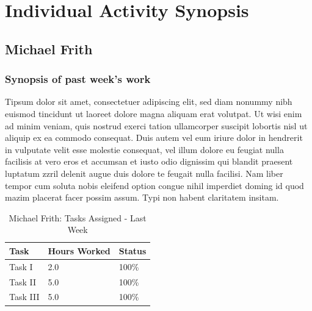 \documentclass[12pt,journal]{IEEEtran}
\begin{document}
\section{Individual Activity Synopsis}
	\subsection{Michael Frith}

	\subsubsection*{Synopsis of past week's work}
    Tipsum dolor sit amet, consectetuer adipiscing elit, sed diam nonummy nibh 
	euismod tincidunt ut laoreet dolore magna aliquam erat volutpat. Ut wisi enim ad minim veniam, quis 
	nostrud exerci tation ullamcorper suscipit lobortis nisl ut aliquip ex ea commodo consequat. Duis 
	autem vel eum iriure dolor in hendrerit in vulputate velit esse molestie consequat, vel illum dolore 
	eu feugiat nulla facilisis at vero eros et accumsan et iusto odio dignissim qui blandit praesent luptatum 
	zzril delenit augue duis dolore te feugait nulla facilisi. Nam liber tempor cum soluta nobis eleifend option 
	congue nihil imperdiet doming id quod mazim placerat facer possim assum. Typi non habent claritatem insitam.


    \begin{table}[H]
		\renewcommand{\arraystretch}{1.3}
		\caption{Michael Frith: Tasks Assigned - Last Week}
		
		\label{Summary of Michael Frith's activities: last week}
		
		\centering
		\begin{tabular}{p{5cm}|p{1cm}|p{1cm}}
		\hline
		\bfseries 	Task								& \bfseries Hours Worked	& \bfseries Status	\\
		\hline\hline
					      Task I 					 	            			& 2.0                   	& 100\%             \\
                Task II 														& 5.0                   	& 100\%             \\
                Task III														& 5.0                   	& 100\%             \\

		\end{tabular}
	\end{table}
\end{document}
